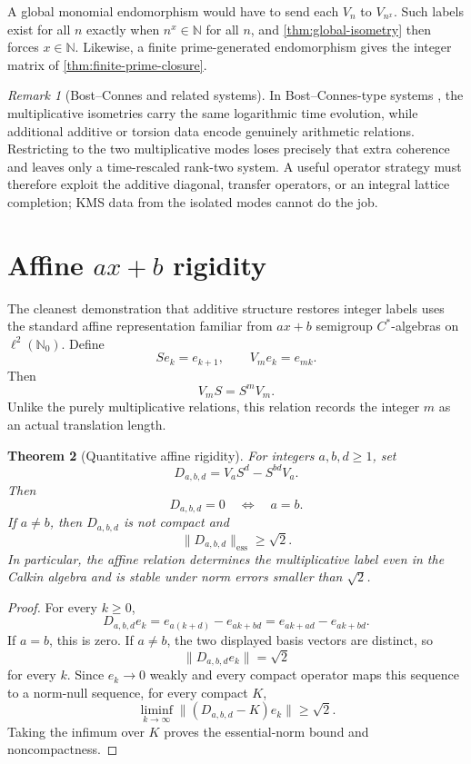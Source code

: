 \documentclass[11pt,oneside]{article}
\newtheorem{theorem}{Theorem}[section]
\theoremstyle{definition}
\theoremstyle{remark}
\newtheorem{remark}[theorem]{Remark}
\newcommand{\N}{\mathbb N}
\newcommand{\Nzero}{\mathbb N_0}
\begin{document}
A global monomial endomorphism would have to send each \(V_n\) to
\(V_{n^x}\).  Such labels exist for all \(n\) exactly when
\(n^x\in\N\) for all \(n\), and \cref{thm:global-isometry} then forces
\(x\in\N\).  Likewise, a finite prime-generated endomorphism gives the
integer matrix of \cref{thm:finite-prime-closure}.

\begin{remark}[Bost--Connes and related systems]
In Bost--Connes-type systems \cite{BostConnes}, the multiplicative isometries carry the
same logarithmic time evolution, while additional additive or torsion
data encode genuinely arithmetic relations.  Restricting to the two
multiplicative modes loses precisely that extra coherence and leaves
only a time-rescaled rank-two system.  A useful operator strategy must
therefore exploit the additive diagonal, transfer operators, or an
integral lattice completion; KMS data from the isolated modes cannot do
the job.
\end{remark}

\section{Affine \(ax+b\) rigidity}

The cleanest demonstration that additive structure restores integer
labels uses the standard affine representation familiar from
\(ax+b\) semigroup \(C^*\)-algebras \cite{CuntzAxB,BrownloweEtAl} on
\(\ell^2(\Nzero)\).  Define
\[
        Se_k=e_{k+1},\qquad
        V_m e_k=e_{mk}.
\]
Then
\begin{equation}\label{eq:axb}
        V_mS=S^mV_m.
\end{equation}
Unlike the purely multiplicative relations, this relation records the
integer \(m\) as an actual translation length.

\begin{theorem}[Quantitative affine rigidity]\label{thm:affine-rigidity}
For integers \(a,b,d\geq1\), set
\[
        D_{a,b,d}=V_aS^d-S^{bd}V_a.
\]
Then
\[
        D_{a,b,d}=0\quad\Longleftrightarrow\quad a=b.
\]
If \(a\neq b\), then \(D_{a,b,d}\) is not compact and
\[
        \|D_{a,b,d}\|_{\mathrm{ess}}\geq\sqrt2.
\]
In particular, the affine relation determines the multiplicative label
even in the Calkin algebra and is stable under norm errors smaller than
\(\sqrt2\).
\end{theorem}

\begin{proof}
For every \(k\geq0\),
\[
 D_{a,b,d}e_k
 =e_{a(k+d)}-e_{ak+bd}
 =e_{ak+ad}-e_{ak+bd}.
\]
If \(a=b\), this is zero.  If \(a\neq b\), the two displayed basis
vectors are distinct, so
\[
        \|D_{a,b,d}e_k\|=\sqrt2
\]
for every \(k\).  Since \(e_k\to0\) weakly and every compact operator
maps this sequence to a norm-null sequence, for every compact \(K\),
\[
        \liminf_{k\to\infty}\|(D_{a,b,d}-K)e_k\|\geq\sqrt2.
\]
Taking the infimum over \(K\) proves the essential-norm bound and
noncompactness.
\end{proof}
\end{document}
